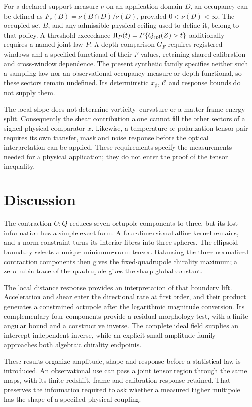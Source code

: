 \documentclass[aps,prd,reprint,onecolumn,11pt,nofootinbib,notitlepage]{revtex4-2}
\begin{document}
For a declared support measure \(\nu\) on an application domain \(D\), an occupancy can be defined as \(F_\nu(B)=\nu(B\cap D)/\nu(D)\), provided \(0<\nu(D)<\infty\). The occupied set \(B\), and any admissible physical ceiling used to define it, belong to that policy. A threshold exceedance \(\Pi_P(t)=P\{Q_{\rm cpl}(Z)>t\}\) additionally requires a named joint law \(P\). A depth comparison \(G_F\) requires registered windows and a specified functional of their \(F\) values, retaining shared calibration and cross-window dependence. The present synthetic family specifies neither such a sampling law nor an observational occupancy measure or depth functional, so these sectors remain undefined. Its deterministic \(x_\phi\), \(\mathcal C\) and response bounds do not supply them.

The local slope does not determine vorticity, curvature or a matter-frame energy split. Consequently the shear contribution alone cannot fill the other sectors of a signed physical comparator \(x\). Likewise, a temperature or polarization tensor pair requires its own transfer, mask and noise response before the optical interpretation can be applied. These requirements specify the measurements needed for a physical application; they do not enter the proof of the tensor inequality.

\section{Discussion}

The contraction \(O:Q\) reduces seven octupole components to three, but its lost information has a simple exact form. A four-dimensional affine kernel remains, and a norm constraint turns its interior fibres into three-spheres. The ellipsoid boundary selects a unique minimum-norm tensor. Balancing the three normalized contraction components then gives the fixed-quadrupole chirality maximum; a zero cubic trace of the quadrupole gives the sharp global constant.

The local distance response provides an interpretation of that boundary lift. Acceleration and shear enter the directional rate at first order, and their product generates a constrained octupole after the logarithmic magnitude conversion. Its complementary four components provide a residual morphology test, with a finite angular bound and a constructive inverse. The complete ideal field supplies an intercept-independent inverse, while an explicit small-amplitude family approaches both algebraic chirality endpoints.

These results organize amplitude, shape and response before a statistical law is introduced. An observational use can pass a joint tensor region through the same maps, with its finite-redshift, frame and calibration response retained. That preserves the information required to ask whether a measured higher multipole has the shape of a specified physical coupling.


\end{document}
